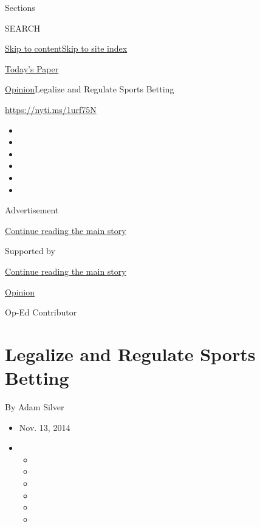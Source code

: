 Sections

SEARCH

\protect\hyperlink{site-content}{Skip to
content}\protect\hyperlink{site-index}{Skip to site index}

\href{https://myaccount.nytimes3xbfgragh.onion/auth/login?response_type=cookie\&client_id=vi}{}

\href{https://www.nytimes3xbfgragh.onion/section/todayspaper}{Today's
Paper}

\href{/section/opinion}{Opinion}\textbar{}Legalize and Regulate Sports
Betting

\url{https://nyti.ms/1urf75N}

\begin{itemize}
\item
\item
\item
\item
\item
\item
\end{itemize}

Advertisement

\protect\hyperlink{after-top}{Continue reading the main story}

Supported by

\protect\hyperlink{after-sponsor}{Continue reading the main story}

\href{/section/opinion}{Opinion}

Op-Ed Contributor

\hypertarget{legalize-and-regulate-sports-betting}{%
\section{Legalize and Regulate Sports
Betting}\label{legalize-and-regulate-sports-betting}}

By Adam Silver

\begin{itemize}
\item
  Nov. 13, 2014
\item
  \begin{itemize}
  \item
  \item
  \item
  \item
  \item
  \item
  \end{itemize}
\end{itemize}

